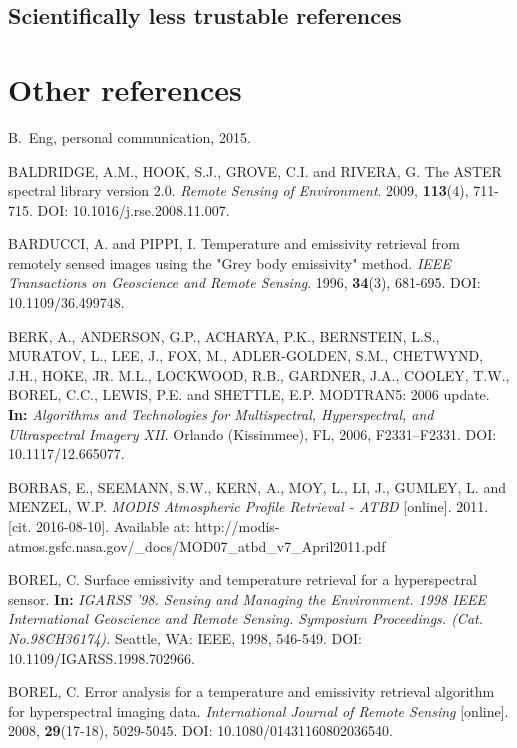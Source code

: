 \begin{thebibliography}{10}
\subsection*{Scientifically less trustable references}


\section*{Other references}


B.~Eng, personal communication, 2015.

 BALDRIDGE, A.M., HOOK, S.J., GROVE, C.I. and RIVERA, G. The ASTER spectral library version 2.0. \textit{Remote Sensing of Environment}. 2009, \textbf{113}(4), 711-715. DOI: 10.1016/j.rse.2008.11.007.

 BARDUCCI, A. and PIPPI, I. Temperature and emissivity retrieval from remotely sensed images using the "Grey body emissivity" method. \textit{IEEE Transactions on Geoscience and Remote Sensing}. 1996, \textbf{34}(3), 681-695. DOI: 10.1109/36.499748.

 BERK, A., ANDERSON, G.P., ACHARYA, P.K., BERNSTEIN, L.S., MURATOV, L., LEE, J., FOX, M., ADLER-GOLDEN, S.M., CHETWYND, J.H., HOKE, JR. M.L., LOCKWOOD, R.B., GARDNER, J.A., COOLEY, T.W., BOREL, C.C., LEWIS, P.E. and SHETTLE, E.P. MODTRAN5: 2006 update. \textbf{In:} \textit{Algorithms and Technologies for Multispectral, Hyperspectral, and Ultraspectral Imagery XII}. Orlando (Kissimmee), FL, 2006, F2331--F2331. DOI: 10.1117/12.665077.

 BORBAS, E., SEEMANN, S.W., KERN, A., MOY, L., LI, J., GUMLEY, L. and MENZEL, W.P. \textit{MODIS Atmospheric Profile Retrieval - ATBD} [online]. 2011. [cit. 2016-08-10]. Available at: http://modis-atmos.gsfc.nasa.gov/\_docs/MOD07\_atbd\_v7\linebreak\_April2011.pdf

 BOREL, C. Surface emissivity and temperature retrieval for a hyperspectral sensor. \textbf{In:} \textit{IGARSS '98. Sensing and Managing the Environment. 1998 IEEE International Geoscience and Remote Sensing. Symposium Proceedings. (Cat. No.98CH36174).} Seattle, WA: IEEE, 1998, 546-549. DOI: 10.1109/IGARSS.1998.702966.

 BOREL, C. Error analysis for a temperature and emissivity retrieval algorithm for hyperspectral imaging data. \textit{International Journal of Remote Sensing} [online]. 2008, \textbf{29}(17-18), 5029-5045. DOI: 10.1080/01431160802036540.


\end{thebibliography}
